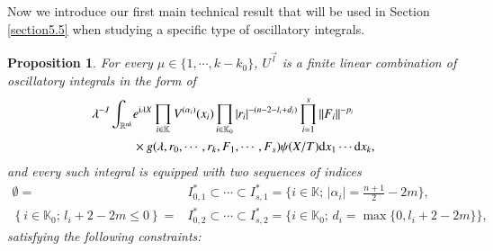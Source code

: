 \documentclass[11pt,reqno]{amsart}
\def\d{{\rm d}}
\newtheorem{proposition}[theorem]{Proposition}
\numberwithin{equation}{section}
\theoremstyle{definition}
\begin{document}
Now we introduce our first main technical result that will be used in Section \ref{section5.5} when studying a specific type of oscillatory integrals.

\begin{proposition}\label{stepmuprop}
	For every $\mu\in\{1,\cdots,k-k_0\}$, $U^{\vec{l}}$ is a finite linear combination of oscillatory integrals in the form of
	\begin{equation}\label{stepmu}
		\begin{split}
			\lambda^{-J}\int_{\mathbb{R}^{nk}}&e^{\mathrm{i}\lambda X}\prod_{i\in\mathbb{K}}V^{(\alpha_i)}(x_i)\prod_{i\in\mathbb{K}_0}|r_i|^{-(n-2-l_i+d_i)}\prod_{i=1}^{s}\|F_i\|^{-{p_i}}\\
			&\times g(\lambda,r_0,\cdots,r_k,F_1,\cdots,F_s)\psi(X/T)\d x_1\cdots \d x_k,
		\end{split}
	\end{equation}
	and every such integral is equipped with two sequences of indices
	\begin{equation}\label{musequences}
		\begin{split}
			\emptyset=&I_{0,1}^*\subset\cdots\subset I_{s,1}^*=\{\mbox{$i\in\mathbb{K};\,|\alpha_i|=\frac{n+1}{2}-2m$}\},\\
			\left\{i\in\mathbb{K}_0;\,l_i+2-2m\leq0\right\}=&I_{0,2}^*\subset\cdots\subset I_{s,2}^*=\{i\in\mathbb{K}_0;\,d_i=\max\{0,l_i+2-2m\}\},
		\end{split}
	\end{equation}
	satisfying the following constraints:
	\begin{itemize}
		

\end{itemize}
\end{proposition}
\end{document}
